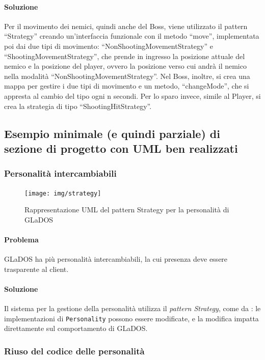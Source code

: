\documentclass[a4paper,12pt]{report}
\begin{document}
\paragraph{Soluzione}
Per il movimento dei nemici, quindi anche del Boss, viene utilizzato il pattern “Strategy” creando un’interfaccia funzionale con il metodo “move”, implementata poi dai due tipi di movimento: “NonShootingMovementStrategy” e “ShootingMovementStrategy”, che prende in ingresso la posizione attuale del nemico e la posizione del player, ovvero la posizione verso cui andrà il nemico nella modalità “NonShootingMovementStrategy”. Nel Boss, inoltre, si crea una mappa per gestire i due tipi di movimento e un metodo, “changeMode”, che si appresta al cambio del tipo ogni n secondi. Per lo sparo invece, simile al Player, si crea la strategia di tipo “ShootingHitStrategy”.


\subsection*{Esempio minimale (e quindi parziale) di sezione di progetto con UML ben realizzati}

\subsubsection{Personalità intercambiabili}

\begin{figure}[H]
    \centering{}
    \texttt{[image: img/strategy]}
    \caption{Rappresentazione UML del pattern Strategy per la personalità di GLaDOS}
    \label{img:strategy}
\end{figure}

\paragraph{Problema} GLaDOS ha più personalità intercambiabili, la cui presenza deve essere trasparente al client.

\paragraph{Soluzione} Il sistema per la gestione della personalità utilizza il \textit{pattern Strategy}, come da
: le implementazioni di \texttt{Personality} possono essere modificate, e la
modifica impatta direttamente sul comportamento di GLaDOS.

\subsubsection{Riuso del codice delle personalità}
\end{document}
